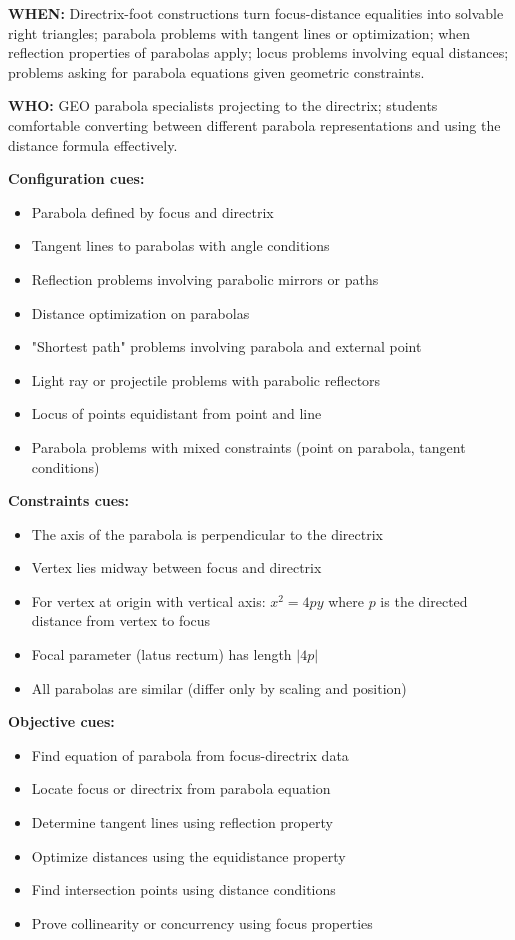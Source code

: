 \documentclass[12pt]{article}
\begin{document}
\textbf{WHEN:} Directrix-foot constructions turn focus-distance equalities into solvable right triangles; parabola problems with tangent lines or optimization; when reflection properties of parabolas apply; locus problems involving equal distances; problems asking for parabola equations given geometric constraints.

\textbf{WHO:} GEO parabola specialists projecting to the directrix; students comfortable converting between different parabola representations and using the distance formula effectively.

\textbf{Configuration cues:}
\begin{itemize}
    \item Parabola defined by focus and directrix
    \item Tangent lines to parabolas with angle conditions
    \item Reflection problems involving parabolic mirrors or paths
    \item Distance optimization on parabolas
    \item "Shortest path" problems involving parabola and external point
    \item Light ray or projectile problems with parabolic reflectors
    \item Locus of points equidistant from point and line
    \item Parabola problems with mixed constraints (point on parabola, tangent conditions)
\end{itemize}

\textbf{Constraints cues:}
\begin{itemize}
    \item The axis of the parabola is perpendicular to the directrix
    \item Vertex lies midway between focus and directrix
    \item For vertex at origin with vertical axis: $x^2 = 4py$ where $p$ is the directed distance from vertex to focus
    \item Focal parameter (latus rectum) has length $|4p|$
    \item All parabolas are similar (differ only by scaling and position)
\end{itemize}

\textbf{Objective cues:}
\begin{itemize}
    \item Find equation of parabola from focus-directrix data
    \item Locate focus or directrix from parabola equation
    \item Determine tangent lines using reflection property
    \item Optimize distances using the equidistance property
    \item Find intersection points using distance conditions
    \item Prove collinearity or concurrency using focus properties
\end{itemize}
\end{document}
